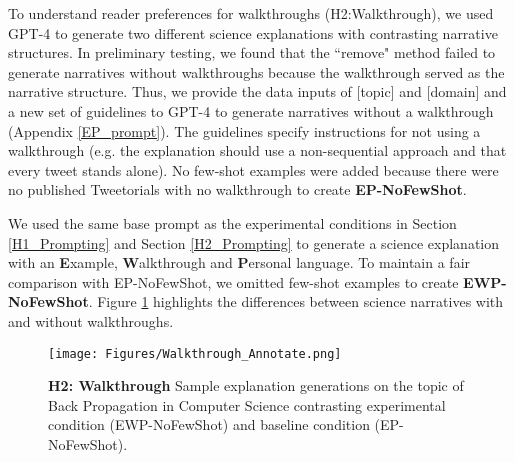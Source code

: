 To understand reader preferences for walkthroughs (H2:Walkthrough), we used GPT-4 to generate two different science explanations with contrasting narrative structures. In preliminary testing, we found that the ``remove" method failed to generate narratives without walkthroughs because the walkthrough served as the narrative structure. Thus, we provide the data inputs of [topic] and [domain] and a new set of guidelines to GPT-4 to generate narratives without a walkthrough (Appendix \ref{EP_prompt}). The guidelines specify instructions for not using a walkthrough (e.g. the explanation should use a non-sequential approach and that every tweet stands alone). No few-shot examples were added because there were no published Tweetorials with no walkthrough to create \textbf{EP-NoFewShot}.

We used the same base prompt as the experimental conditions in Section \ref{H1_Prompting} and Section \ref{H2_Prompting} to generate a science explanation with an \textbf{E}xample, \textbf{W}alkthrough and \textbf{P}ersonal language. To maintain a fair comparison with EP-NoFewShot, we omitted few-shot examples to create \textbf{EWP-NoFewShot}. Figure \ref{fig:walkthrough} highlights the differences between science narratives with and without walkthroughs.



\begin{figure}
    \centering
    \texttt{[image: Figures/Walkthrough\_Annotate.png]}
    \caption{\textbf{H2: Walkthrough} Sample explanation generations on the topic of Back Propagation in Computer Science contrasting experimental condition (EWP-NoFewShot) and baseline condition (EP-NoFewShot).}
    \label{fig:walkthrough}
\end{figure}


